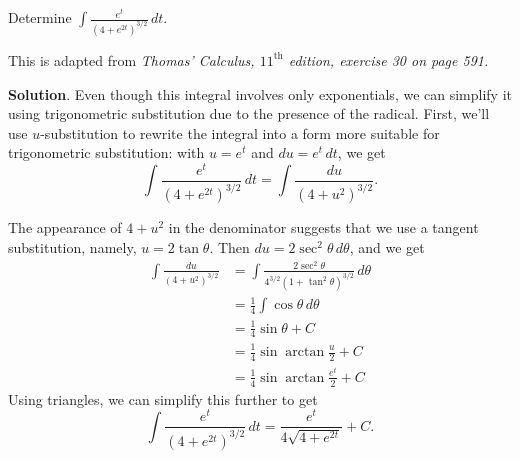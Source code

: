\documentclass[10pt,]{book}
\theoremstyle{ptxplainnotitle}
\theoremstyle{ptxplaintitle}
\theoremstyle{ptxplainnotitle}
\theoremstyle{ptxplaintitle}
\theoremstyle{ptxplainnotitle}
\theoremstyle{ptxplaintitle}
\theoremstyle{ptxdefinitionnotitle}
\theoremstyle{ptxdefinitiontitle}
\theoremstyle{ptxdefinitionnotitle}
\theoremstyle{ptxdefinitiontitle}
\theoremstyle{ptxdefinitionnotitle}
\theoremstyle{ptxdefinitiontitle}
\theoremstyle{ptxdefinitionnotitle}
\theoremstyle{ptxdefinitiontitle}
\theoremstyle{ptxdefinitionnotitle}
\theoremstyle{ptxdefinitiontitle}
\numberwithin{equation}{section}
\begin{document}
\begin{example}\label{example-an-exponential-integral}
\hypertarget{p-545}{}%
Determine \(\displaystyle\int\frac{e^{t}}{(4 + e^{2t})^{3/2}}\,dt.\)%
\begin{aside}{}\label{aside-10}
\hypertarget{p-546}{}%
This is adapted from \emph{Thomas' Calculus, \(11^{\text{th}}\) edition, exercise 30 on page 591.}%
\end{aside}
\par\smallskip%
\noindent\textbf{Solution}.\hypertarget{solution-120}{}\quad%
\hypertarget{p-547}{}%
Even though this integral involves only exponentials, we can simplify it using trigonometric substitution due to the presence of the radical. First, we'll use \(u\)-substitution to rewrite the integral into a form more suitable for trigonometric substitution: with \(u = e^{t}\) and \(du = e^{t}\,dt\), we get%
\begin{equation*}
\int\frac{e^{t}}{(4 + e^{2t})^{3/2}}\,dt = \int\frac{du}{(4 + u^{2})^{3/2}}.
\end{equation*}
%
\par
\hypertarget{p-548}{}%
The appearance of \(4 + u^{2}\) in the denominator suggests that we use a tangent substitution, namely, \(u = 2\tan\theta\). Then \(du = 2\sec^{2}\theta\,d\theta\), and we get%
\begin{align*}
\int\frac{du}{(4 + u^{2})^{3/2}} & = \int\frac{2\sec^{2}\theta}{4^{3/2}(1 + \tan^{2}\theta)^{3/2}}\,d\theta \\
& = \frac{1}{4}\int\cos\theta\,d\theta \\
& = \frac{1}{4}\sin\theta + C \\
& = \frac{1}{4}\sin\arctan\frac{u}{2} + C \\
& = \frac{1}{4}\sin\arctan\frac{e^{t}}{2} + C 
\end{align*}
Using triangles, we can simplify this further to get%
\begin{equation*}
\int\frac{e^{t}}{(4 + e^{2t})^{3/2}}\,dt = \frac{e^{t}}{4\sqrt{4 + e^{2t}}} + C.
\end{equation*}
%
\end{example}
\typeout{************************************************}
\typeout{************************************************}
\end{document}
